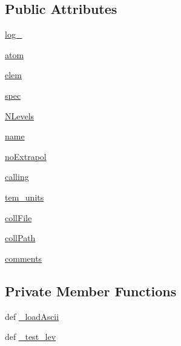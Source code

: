 \subsection*{Public Attributes}
\begin{DoxyCompactItemize}
\item 
\hyperlink{classpyneb_1_1core_1_1pynebcore_1_1___coll_data_ascii_a9277c108416ceb0bbdca484a4a246b5c}{log\-\_\-}
\item 
\hyperlink{classpyneb_1_1core_1_1pynebcore_1_1___coll_data_ascii_a47fdeb51513849a90f420296a0383d33}{atom}
\item 
\hyperlink{classpyneb_1_1core_1_1pynebcore_1_1___coll_data_ascii_a2e7f8f27e94e2aa068d869cd4dad2ee2}{elem}
\item 
\hyperlink{classpyneb_1_1core_1_1pynebcore_1_1___coll_data_ascii_a75f41e91e7eb224162912bedac22b342}{spec}
\item 
\hyperlink{classpyneb_1_1core_1_1pynebcore_1_1___coll_data_ascii_a718c85715ee6ef5dfdd4136e2031030b}{N\-Levels}
\item 
\hyperlink{classpyneb_1_1core_1_1pynebcore_1_1___coll_data_ascii_a39c9697691d3e8e8d7f99c05e0baa4a9}{name}
\item 
\hyperlink{classpyneb_1_1core_1_1pynebcore_1_1___coll_data_ascii_aa4f6c8d0a2a8e4ac6503d67b4a51188d}{no\-Extrapol}
\item 
\hyperlink{classpyneb_1_1core_1_1pynebcore_1_1___coll_data_ascii_a08efc5898f4e03a1b7702d85f909e188}{calling}
\item 
\hyperlink{classpyneb_1_1core_1_1pynebcore_1_1___coll_data_ascii_ad026d62c0262a257b38f70a1d7b88c9b}{tem\-\_\-units}
\item 
\hyperlink{classpyneb_1_1core_1_1pynebcore_1_1___coll_data_ascii_a8f7186365d566d4de80bf20b41b51c75}{coll\-File}
\item 
\hyperlink{classpyneb_1_1core_1_1pynebcore_1_1___coll_data_ascii_aa407510c78da8c376cd7d82a2ec87ba4}{coll\-Path}
\item 
\hyperlink{classpyneb_1_1core_1_1pynebcore_1_1___coll_data_ascii_ace4b313bdacd14dea0112b9ff7fe0b7c}{comments}
\end{DoxyCompactItemize}
\subsection*{Private Member Functions}
\begin{DoxyCompactItemize}
\item 
def \hyperlink{classpyneb_1_1core_1_1pynebcore_1_1___coll_data_ascii_a55b8181b2259b06ceb5bc401834b276f}{\-\_\-load\-Ascii}
\item 
def \hyperlink{classpyneb_1_1core_1_1pynebcore_1_1___coll_data_ascii_ab0aa6c61eca4fb3b526265776caab5b4}{\-\_\-test\-\_\-lev}
\end{DoxyCompactItemize}
